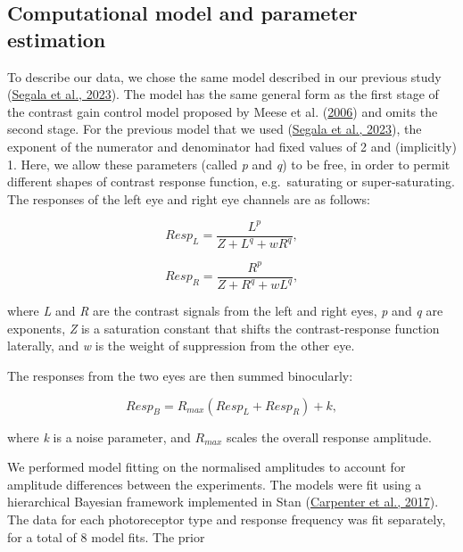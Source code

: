 \documentclass[
]{article}
\begin{document}
\hypertarget{computational-model-and-parameter-estimation}{%
\subsection{Computational model and parameter estimation}\label{computational-model-and-parameter-estimation}}

To describe our data, we chose the same model described in our previous study (\protect\hyperlink{ref-Segala2023}{Segala et al., 2023}). The model has the same general form as the first stage of the contrast gain control model proposed by Meese et al. (\protect\hyperlink{ref-Meese2006}{2006}) and omits the second stage. For the previous model that we used (\protect\hyperlink{ref-Segala2023}{Segala et al., 2023}), the exponent of the numerator and denominator had fixed values of 2 and (implicitly) 1. Here, we allow these parameters (called \emph{p} and \emph{q}) to be free, in order to permit different shapes of contrast response function, e.g.~saturating or super-saturating. The responses of the left eye and right eye channels are as follows:

\begin{equation}
\label{eq:respLchap4}
Resp_L = \frac{L^p}{Z + L^q + wR^q},
\end{equation}

\begin{equation}
\label{eq:respRchap4}
Resp_R = \frac{R^p}{Z + R^q + wL^q},
\end{equation}

\noindent where \emph{L} and \emph{R} are the contrast signals from the left and right eyes, \emph{p} and \emph{q} are exponents, \emph{Z} is a saturation constant that shifts the contrast-response function laterally, and \emph{w} is the weight of suppression from the other eye.

The responses from the two eyes are then summed binocularly:

\begin{equation}
\label{eq:respBchap4}
Resp_B = R_{max}(Resp_L + Resp_R) + k,
\end{equation}

\noindent where \emph{k} is a noise parameter, and \(R_{max}\) scales the overall response amplitude.

We performed model fitting on the normalised amplitudes to account for amplitude differences between the experiments. The models were fit using a hierarchical Bayesian framework implemented in Stan (\protect\hyperlink{ref-Carpenter2017}{Carpenter et al., 2017}). The data for each photoreceptor type and response frequency was fit separately, for a total of 8 model fits. The prior
\end{document}
